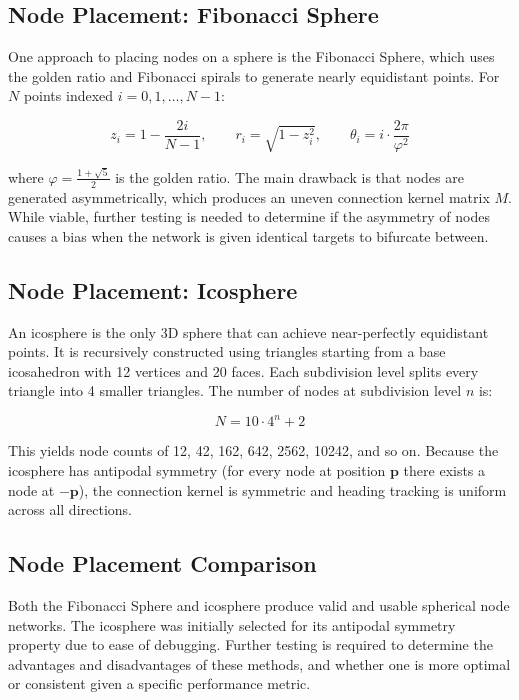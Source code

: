 \documentclass[12pt, letterpaper]{article}
\begin{document}
\subsection{Node Placement: Fibonacci Sphere}

One approach to placing nodes on a sphere is the Fibonacci Sphere, which uses the golden ratio and Fibonacci spirals to generate nearly equidistant points. For $N$ points indexed $i = 0, 1, \ldots, N-1$:

\begin{equation}
    z_i = 1 - \frac{2i}{N-1}, \qquad r_i = \sqrt{1 - z_i^2}, \qquad \theta_i = i \cdot \frac{2\pi}{\varphi^2}
\end{equation}

where $\varphi = \frac{1+\sqrt{5}}{2}$ is the golden ratio. The main drawback is that nodes are generated asymmetrically, which produces an uneven connection kernel matrix $M$. While viable, further testing is needed to determine if the asymmetry of nodes causes a bias when the network is given identical targets to bifurcate between.

\subsection{Node Placement: Icosphere}

An icosphere is the only 3D sphere that can achieve near-perfectly equidistant points. It is recursively constructed using triangles starting from a base icosahedron with 12 vertices and 20 faces. Each subdivision level splits every triangle into 4 smaller triangles. The number of nodes at subdivision level $n$ is:

\begin{equation}
    N = 10 \cdot 4^n + 2
\end{equation}

This yields node counts of 12, 42, 162, 642, 2562, 10242, and so on. Because the icosphere has antipodal symmetry (for every node at position $\mathbf{p}$ there exists a node at $-\mathbf{p}$), the connection kernel is symmetric and heading tracking is uniform across all directions.

\subsection{Node Placement Comparison}
Both the Fibonacci Sphere and icosphere produce valid and usable spherical node networks. The icosphere was initially selected for its antipodal symmetry property due to ease of debugging. Further testing is required to determine the advantages and disadvantages of these methods, and whether one is more optimal or consistent given a specific performance metric.  
\end{document}
